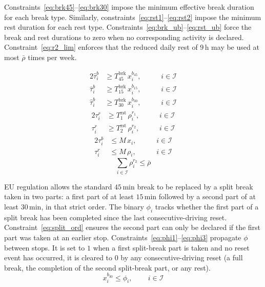 \documentclass[preprint,12pt,3p]{elsarticle}
\begin{document}
Constraints~\eqref{eq:brk45}--\eqref{eq:brk30} impose the minimum effective break duration for each break type. Similarly, constraints~\eqref{eq:rst1}--\eqref{eq:rst2} impose the minimum rest duration for each rest type. Constraints~\eqref{eq:brk_ub}--\eqref{eq:rst_ub} force the break and rest durations to zero when no corresponding activity is declared. Constraint~\eqref{eq:r2_lim} enforces that the reduced daily rest of $9$\,h may be used at most $\bar \rho$ times per week.

\begin{alignat}{2}
    \hat{\tau}_i^b &\geq T^{\mathrm{brk}}_{45}\, x_i^{b_{45}}, &\quad& \, i \in \mathcal{I}
    \label{eq:brk45}\\
    \hat{\tau}_i^b &\geq T^{\mathrm{brk}}_{15}\, x_i^{b_{15}}, &\quad& \, i \in \mathcal{I}
    \label{eq:brk15}\\
    \hat{\tau}_i^b &\geq T^{\mathrm{brk}}_{30}\, x_i^{b_{30}}, &\quad& \, i \in \mathcal{I}
    \label{eq:brk30}
\end{alignat}
\begin{alignat}{2}
    \tau_i^r &\geq T^{\mathrm{rst}}_{1}\, \rho_i^{r_1}, &\quad& \, i \in \mathcal{I}
    \label{eq:rst1}\\
    \tau_i^r &\geq T^{\mathrm{rst}}_{2}\, \rho_i^{r_2}, &\quad& \, i \in \mathcal{I}
    \label{eq:rst2}
\end{alignat}
\begin{alignat}{2}
    \tau_i^b &\leq M\, x_i,    &\quad& \, i \in \mathcal{I}
    \label{eq:brk_ub}\\
    \tau_i^r &\leq M\, \rho_i, &\quad& \, i \in \mathcal{I}
    \label{eq:rst_ub}
\end{alignat}
\begin{equation}
    \sum_{i \in \mathcal{I}} \rho_i^{r_2} \leq \bar{\rho}
    \label{eq:r2_lim}
\end{equation}

EU regulation allows the standard $45$\,min break to be replaced by a split break taken in two parts: a first part of at least $15$\,min followed by a second part of at least $30$\,min, in that strict order. The binary $\phi_i$ tracks whether the first part of a split break has been completed since the last consecutive-driving reset. Constraint~\eqref{eq:split_ord} ensures the second part can only be declared if the first part was taken at an earlier stop. Constraints~\eqref{eq:phi1}--\eqref{eq:phi3} propagate $\phi$ between stops. It is set to $1$ when a first split-break part is taken and no reset event has occurred, it is cleared to $0$ by any consecutive-driving reset (a full break, the completion of the second split-break part, or any rest).
\begin{equation}
    x_i^{b_{30}} \leq \phi_i,
    \qquad \, i \in \mathcal{I}
    \label{eq:split_ord}
\end{equation}
\end{document}
